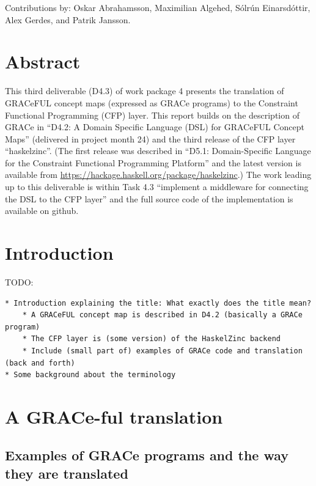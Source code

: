 \documentclass{article}
\begin{document}
Contributions by: Oskar Abrahamsson, Maximilian Algehed, Sólrún
Einarsdóttir, Alex Gerdes, and Patrik Jansson.

\vfill

\setcounter{tocdepth}{2}
\tableofcontents

\vfill

\newpage

\section*{Abstract}\label{abstract}

This third deliverable (D4.3) of work package 4 presents the
translation of GRACeFUL concept maps (expressed as GRACe programs) to
the Constraint Functional Programming (CFP) layer.
%
This report builds on the description of GRACe in ``D4.2: A Domain
Specific Language (DSL) for GRACeFUL Concept Maps'' (delivered in
project month 24) and the third release of the CFP layer ``haskelzinc''.
%
(The first release was described in ``D5.1: Domain-Specific Language
for the Constraint Functional Programming Platform'' and the latest
version is available from
\url{https://hackage.haskell.org/package/haskelzinc}.)
%
The work leading up to this deliverable is within Task 4.3 ``implement
a middleware for connecting the DSL to the CFP layer'' and the full
source code of the implementation is available on github.


\section{Introduction}

TODO:
\begin{verbatim}
* Introduction explaining the title: What exactly does the title mean?
    * A GRACeFUL concept map is described in D4.2 (basically a GRACe program)
    * The CFP layer is (some version) of the HaskelZinc backend
    * Include (small part of) examples of GRACe code and translation (back and forth)
* Some background about the terminology
\end{verbatim}

\section{A GRACe-ful translation}

\subsection{Examples of GRACe programs and the way they are translated}
\end{document}
